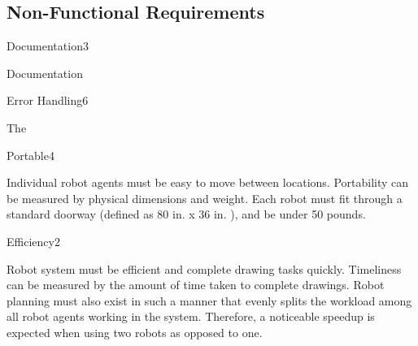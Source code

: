 
\subsection{Non-Functional Requirements}
\label{sec:nonfunctional_requirements}

\begin{nonfunctional_requirement}{Documentation}{3}
\item Documentation
\end{nonfunctional_requirement}

\begin{nonfunctional_requirement}{Error Handling}{6}
\item The
\end{nonfunctional_requirement}

\begin{nonfunctional_requirement}{Portable}{4}
\item Individual robot agents must be easy to move between locations. Portability can be measured by physical dimensions and weight. Each robot must fit through a standard doorway (defined as 80 in. x 36 in. \cite{homedepotdoor}), and be under 50 pounds.
\end{nonfunctional_requirement}


\begin{nonfunctional_requirement}{Efficiency}{2}
\item Robot system must be efficient and complete drawing tasks quickly. Timeliness can be measured by the amount of time taken to complete drawings. Robot planning must also exist in such a manner that evenly splits the workload among all robot agents working in the system. Therefore, a noticeable speedup is expected when using two robots as opposed to one. 
\end{nonfunctional_requirement}

